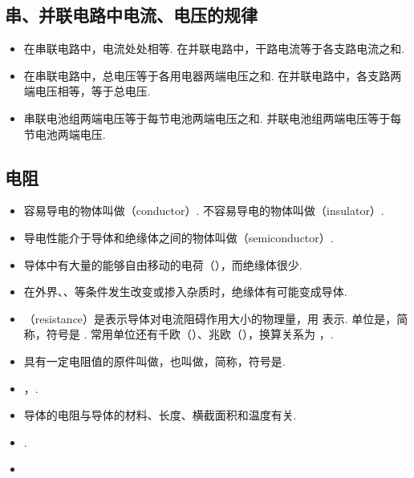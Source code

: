 \subsection{串、并联电路中电流、电压的规律}
\vspace{10pt}
\begin{itemize}
\item 在串联电路中，电流处处相等. 在并联电路中，干路电流等于各支路电流之和.
\item 在串联电路中，总电压等于各用电器两端电压之和. 在并联电路中，各支路两端电压相等，等于总电压.
\item 串联电池组两端电压等于每节电池两端电压之和. 并联电池组两端电压等于每节电池两端电压.
\end{itemize}

\subsection{电阻}
\vspace{10pt}
\begin{itemize}
\item 容易导电的物体叫做（conductor）. 不容易导电的物体叫做（insulator）.
\item 导电性能介于导体和绝缘体之间的物体叫做（semiconductor）.
\item 导体中有大量的能够自由移动的电荷（），而绝缘体很少.
\item 在外界、、等条件发生改变或掺入杂质时，绝缘体有可能变成导体.
\item {}（resistance）是表示导体对电流阻碍作用大小的物理量，用  表示. 单位是，简称，符号是 \blue{$\bm\Omega$}. 常用单位还有千欧（）、兆欧（），换算关系为 ，.
\item 具有一定电阻值的原件叫做，也叫做，简称，符号是\resistance. 
\item {}，.
\item 导体的电阻与导体的材料、长度、横截面积和温度有关.
\item {}.
\item 
\end{itemize}